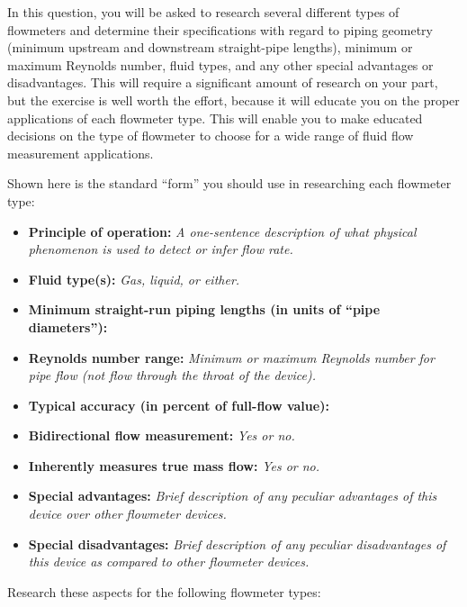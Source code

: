 

In this question, you will be asked to research several different types of flowmeters and determine their specifications with regard to piping geometry (minimum upstream and downstream straight-pipe lengths), minimum or maximum Reynolds number, fluid types, and any other special advantages or disadvantages.  This will require a significant amount of research on your part, but the exercise is well worth the effort, because it will educate you on the proper applications of each flowmeter type.  This will enable you to make educated decisions on the type of flowmeter to choose for a wide range of fluid flow measurement applications.

Shown here is the standard ``form'' you should use in researching each flowmeter type:

\vskip 10pt

\begin{itemize}
\item{} {\bf Principle of operation:} {\it A one-sentence description of what physical phenomenon is used to detect or infer flow rate.}
\item{} {\bf Fluid type(s):} {\it Gas, liquid, or either.}
\item{} {\bf Minimum straight-run piping lengths (in units of ``pipe diameters''):}
\item{} {\bf Reynolds number range:} {\it Minimum or maximum Reynolds number for pipe flow (not flow through the throat of the device).}
\item{} {\bf Typical accuracy (in percent of full-flow value):}  
\item{} {\bf Bidirectional flow measurement:} {\it Yes or no.}
\item{} {\bf Inherently measures true mass flow:} {\it Yes or no.}
\item{} {\bf Special advantages:} {\it Brief description of any peculiar advantages of this device over other flowmeter devices.}
\item{} {\bf Special disadvantages:} {\it Brief description of any peculiar disadvantages of this device as compared to other flowmeter devices.}
\end{itemize}


\vskip 10pt

Research these aspects for the following flowmeter types:

